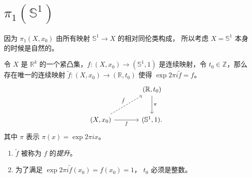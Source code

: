 \documentclass[fontset=none]{Notes}
\begin{document}
\section{\texorpdfstring{$\pi_1(\mathbb{S}^1)$}{圆的基本群}}

因为 $\pi_1(X,x_0)$ 由所有映射 $\mathbb{S}^1\to X$ 的相对同伦类构成，
所以考虑 $X=\mathbb{S}^1$ 本身的时候是自然的。

\begin{lemma}\label{lemma:lift of X}
  令 $X$ 是 $\mathbb{R}^k$ 的一个紧凸集，$f:(X,x_0)\to (\mathbb{S}^1,1)$
  是连续映射，令 $t_0\in \mathbb{Z}$，那么存在唯一的连续映射
  $\tilde f:(X,x_0)\to (\mathbb{R},t_0)$ 使得 $\exp 2\pi i \tilde f=f$。
  \[
    \begin{tikzcd}[sep=large]
      & (\mathbb{R},t_0)\arrow[d,"\pi"] \\
      (X,x_0)\arrow[ur,"\tilde f",dashed]\arrow[r,"f"']
      & (\mathbb{S}^1,1).
    \end{tikzcd}
  \]
  其中 $\pi$ 表示 $\pi(x)=\exp 2\pi i x$。
\end{lemma}
\begin{remark}
  \begin{enumerate}
    \item $\tilde{f}$ 被称为 $f$ 的\emph{提升}。
    \item 为了满足 $\exp 2\pi i \tilde f(x_0)=f(x_0)=1$，
    $t_0$ 必须是整数。
  \end{enumerate}
\end{remark}
\end{document}
